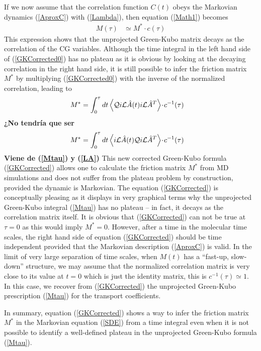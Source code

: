 \documentclass[b5paper,openright,10pt]{book}
\newcommand{\esc}{\!\cdot\!}
\newcommand{\Note}[1]{{\bf \color{red}#1}}    %
\newcommand{\llangle}{\left\langle}
\newcommand{\rrangle}{\right\rangle}
\begin{document}
If  we now  assume  that  the correlation  function  $C(t)$ obeys  the
Markovian   dynamics   (\ref{AproxC})    with   (\ref{Lambda}),   then
equation (\ref{Math1}) becomes
\begin{align}
M(\tau)&\simeq M^*\esc c(\tau)
\label{GKCorrected0}
\end{align}
This expression shows that the unprojected Green-Kubo matrix decays as the correlation
of the CG variables.
Although   the   time   integral   in    the   left   hand   side   of
(\ref{GKCorrected0}) has  no plateau as  it is obvious by  looking at
the decaying correlation in the right  hand side, it is still possible
to infer the friction matrix $M^*$ by multiplying (\ref{GKCorrected0})
with the inverse of the normalized correlation, leading to
\begin{align}
M^*&= \int_0^{\tau} dt \llangle {\cal Q} i{\cal L}\hat{A} (t)i{\cal L}\hat{A}^T\rrangle\esc  c^{-1}(\tau)
\label{GKCorrected}
\end{align}
\Note{¿No tendría que ser
\begin{align}
    M^*&= \int_0^{\tau} dt \llangle i{\cal L}\hat{A} (t) {\cal Q}i{\cal L}\hat{A}^T\rrangle\esc  c^{-1}(\tau)
\label{GKCorrected}
\end{align}
Viene de (\ref{Mtau}) y (\ref{LA})
}
This new  corrected Green-Kubo formula (\ref{GKCorrected})  allows one
to calculate  the friction matrix  $M^*$ from MD simulations  and does
not  suffer from  the plateau  problem by  construction, provided  the
dynamic is Markovian. The equation   (\ref{GKCorrected}) is conceptually pleasing
as it  displays in  very graphical terms  why the unprojected Green-Kubo
integral  (\ref{Mtau}) has  no plateau  -- in  fact, it  decays as  the
correlation matrix itself.  It is obvious that (\ref{GKCorrected}) can
not be true at $\tau=0$ as this would imply $M^*=0$. However, after a
time  in  the molecular  time  scales,  the  right  hand side  of  equation
(\ref{GKCorrected})  should  be  time independent  provided  that  the
Markovian description (\ref{AproxC})  is valid.  In the  limit of very
large  separation  of  time  scales,  when  $M(t)$  has  a  ``fast-up,
slow-down'' structure,  we may assume that  the normalized correlation
matrix is very close to its value  at $t=0$ which is just the identity
matrix, this  is $  c^{-1}(\tau)\simeq 1$.  In  this case,  we recover
from   (\ref{GKCorrected})   the unprojected   Green-Kubo   prescription
(\ref{Mtau}) for the transport coefficients.


In summary, equation (\ref{GKCorrected}) shows  a way to infer the friction
matrix  $M^*$  in  the  Markovian equation  (\ref{SDE})  from  a  time
integral  even when  it is  not  possible to  identify a  well-defined
plateau in the unprojected Green-Kubo formula (\ref{Mtau}).
\end{document}
